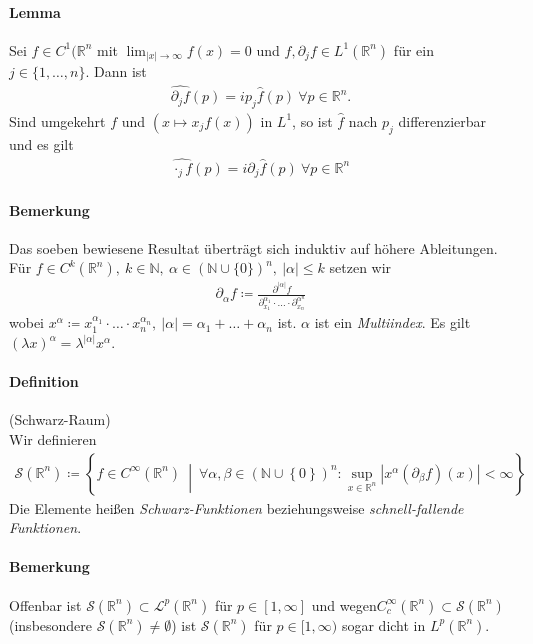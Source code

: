 \documentclass[12pt,a4paper,fleqn]{article}
\def\abs#1{{\left\vert #1 \right\vert}}
\def\set#1{{\left\{ #1 \right\}}}
\def\Mid{\ \middle|\ }
\def\R{{\mathbb{R}}}
\begin{document}
\paragraph{Lemma} Sei $f \in C^1(\mathbb{R}^n$ mit $\lim_{\vert x \vert \rightarrow \infty} f(x) = 0$ und $f, \partial_j f \in L^1(\mathbb{R}^n)$ für ein \mbox{$j \in \{1, \dotsc, n\}$}. Dann ist
\begin{align*}
\widehat{\partial_j f}(p) = ip_j \widehat{f}(p)\ \forall p \in \mathbb{R}^n.
\end{align*}
Sind umgekehrt $f$ und $(x \mapsto x_j f(x))$ in $L^1$, so ist $\widehat{f}$ nach $p_j$ differenzierbar und es gilt
\begin{align*}
\widehat{\cdot_j f}(p) = i\partial_j\widehat{f}(p)\ \forall p \in \mathbb{R}^n
\end{align*}

\paragraph{Bemerkung} Das soeben bewiesene Resultat überträgt sich induktiv auf höhere Ableitungen. Für $f \in C^k(\mathbb{R}^n),\ k \in \mathbb{N},\ \alpha \in (\mathbb{N} \cup \{ 0 \})^n,\ \vert \alpha \vert \leq k$ setzen wir
\begin{align*}
\partial_\alpha f \coloneqq \frac{\partial^{\abs{\alpha}}f}{\partial_{x_1}^{\alpha_1}\cdot \dotsc \cdot \partial_{x_n}^{\alpha^n}}
\end{align*}
wobei $x^\alpha \coloneqq x_1^{\alpha_1}\cdot \dotsc \cdot x_n^{\alpha_n},\ \abs{\alpha} = \alpha_1 + \dotsc + \alpha_n$ ist. $\alpha$ ist ein \textit{Multiindex}. Es gilt $(\lambda x)^\alpha = \lambda^{\abs{\alpha}}x^\alpha$.

\paragraph{Definition} (Schwarz-Raum)\\
Wir definieren
\begin{align*}
\mathscr{S}(\mathbb{R}^n) \coloneqq \set{f \in C^\infty(\mathbb{R}^n) \Mid \forall\alpha, \beta \in (\mathbb{N} \cup \set{0})^n : \sup_{x \in \mathbb{R}^n} \abs{x^\alpha(\partial_\beta f)(x)} < \infty}
\end{align*}
Die Elemente heißen \textit{Schwarz-Funktionen} beziehungsweise \textit{schnell-fallende Funktionen}.

\paragraph{Bemerkung} Offenbar ist $\mathscr{S}(\mathbb{R}^n) \subset \mathscr{L}^p(\mathbb{R}^n)$ für $p \in [1, \infty]$ und wegen\linebreak \mbox{$C^\infty_c(\mathbb{R}^n) \subset \mathscr{S}(\R^n)$} (insbesondere $\mathscr{S}(\R^n) \not = \emptyset$) ist $\mathscr{S}(\R^n)$ für $p \in [1, \infty)$ sogar dicht in $L^p(\R^n)$.
\end{document}
